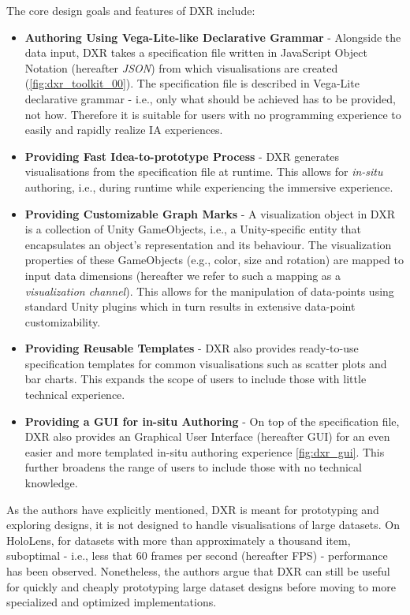 \documentclass{vgtc}                          %
\begin{document}
\noindent The core design goals and features of DXR include:
\begin{itemize}
    \item \textbf{Authoring Using Vega-Lite-like Declarative Grammar} - Alongside the data input, DXR takes a
    specification file written in JavaScript Object Notation (hereafter \textit{JSON}) from which
    visualisations are created (\autoref{fig:dxr_toolkit_00}). The specification file is described in Vega-Lite declarative grammar \cite{vega_lite} - i.e., only what should be
    achieved has to be provided, not how. Therefore it is suitable for users with no programming experience to
    easily and rapidly realize IA experiences.
    \item \textbf{Providing Fast Idea-to-prototype Process} - DXR generates visualisations from the
    specification file at runtime. This allows for \textit{in-situ} authoring, i.e., during runtime while
    experiencing the immersive experience.
    \item \textbf{Providing Customizable Graph Marks} - A visualization object in DXR is a collection of
    Unity GameObjects, i.e., a Unity-specific entity that encapsulates an object's representation and its
    behaviour. The visualization properties of these GameObjects (e.g., color, size and rotation) are mapped
    to input data dimensions (hereafter we refer to such a mapping as a \textit{visualization channel}).
    This allows for the manipulation of data-points using standard Unity plugins which in turn results in
    extensive data-point customizability.
    \item \textbf{Providing Reusable Templates} - DXR also provides ready-to-use specification templates for
    common visualisations such as scatter plots and bar charts. This expands the scope of users to include
    those with little technical experience.
	\item \textbf{Providing a GUI for in-situ Authoring} - On top of the specification file, DXR also
    provides an Graphical User Interface (hereafter GUI) for an even easier and more templated in-situ
        authoring experience \autoref{fig:dxr_gui}. This further broadens the range of users to include those with no technical knowledge.
\end{itemize}

\medskip

\noindent As the authors have explicitly mentioned, DXR is meant for prototyping and exploring designs, it is
not designed to handle visualisations of large datasets. On HoloLens, for datasets with more than
approximately a thousand item, suboptimal - i.e., less that 60 frames per second (hereafter FPS) -
performance has been observed. Nonetheless, the authors argue that DXR can still be useful for quickly and
cheaply prototyping large dataset designs before moving to more specialized and optimized implementations.
\end{document}
